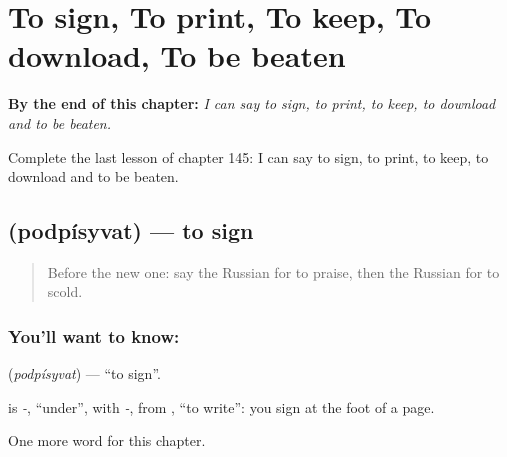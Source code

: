 
\chapter{To sign, To print, To keep, To download, To be beaten}
\label{ch:ru-to-sign-to-print-to-keep-to-download-to-be-beaten}

\begin{chapteropening}
\textbf{By the end of this chapter:} \emph{I can say to sign, to print, to keep, to download and to be beaten.}

Complete the last lesson of chapter 145: I can say to sign, to print, to keep, to download and to be beaten.
\end{chapteropening}

\section[\texorpdfstring{\ru{подписывать} (podpísyvat)}{подписывать (podpísyvat)}]{ (podpísyvat) — to sign}

\label{lesson:RU-C145-podpisyvat}



\begin{quote}
Before the new one: say the Russian for to praise, then the Russian for to scold.
\end{quote}

\subsection*{You'll want to know: }
\textbf{} (\emph{podpísyvat}) — \textquotedblleft{}to sign\textquotedblright{}.

\begin{cousinweb}
\textbf{} is \emph{-}, \textquotedblleft{}under\textquotedblright{}, with \emph{-}, from \emph{}, \textquotedblleft{}to write\textquotedblright{}: you sign at the foot of a page.
\end{cousinweb}

\begin{grammarlens}[title={What you've built}]
One more word for this chapter.
\end{grammarlens}


